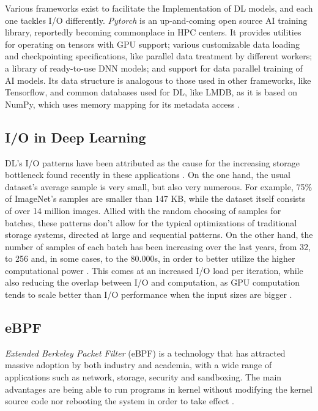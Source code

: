 \documentclass[conference]{IEEEtran}
\begin{document}
Various frameworks exist to facilitate the Implementation of DL models, and each one tackles I/O differently. \textit{Pytorch} \cite{pytorch} is an up-and-coming open source AI training library, reportedly becoming commonplace in HPC centers. It provides utilities for operating on tensors with GPU support; various customizable data loading and checkpointing specifications, like parallel data treatment by different workers; a library of ready-to-use DNN models; and support for data parallel training of AI models. Its data structure is analogous to those used in other frameworks, like Tensorflow, and common databases used for DL, like LMDB, as it is based on NumPy, which uses memory mapping for its metadata access \cite{LMDB}.

\subsection{I/O in Deep Learning}

DL's I/O patterns have been attributed as the cause for the increasing storage bottleneck found recently in these applications \cite{beegfs}. On the one hand, the usual dataset's average sample is very small, but also very numerous. For example, 75\% of ImageNet's samples are smaller than 147 KB, while the dataset itself consists of over 14 million images. Allied with the random choosing of samples for batches, these patterns don't allow for the typical optimizations of traditional storage systems, directed at large and sequential patterns. On the other hand, the number of samples of each batch has been increasing over the last years, from 32, to 256 and, in some cases, to the 80.000s, in order to better utilize the higher computational power \cite{nvme}. This comes at an increased I/O load per iteration, while also reducing the overlap between I/O and computation, as GPU computation tends to scale better than I/O performance when the input sizes are bigger \cite{TFbenchmark}.

\subsection{eBPF}

\textit{Extended Berkeley Packet Filter} (eBPF) is a technology that has attracted massive adoption by both industry and academia, with a wide range of applications such as network, storage, security and sandboxing.
The main advantages are being able to run programs in kernel without modifying the kernel source code nor rebooting the system in order to take effect \cite{eBPFSurvey}.
\end{document}
